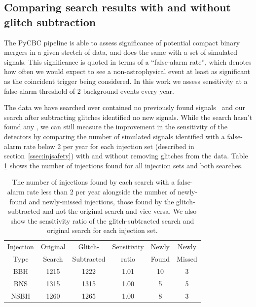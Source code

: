 \subsection{Comparing search results with and without glitch subtraction}

The PyCBC pipeline is able to assess significance of potential compact binary mergers in a given stretch of data, and does the same with a set of simulated signals. This significance is quoted in terms of a ``false-alarm rate'', which denotes how often we would expect to see a non-astrophysical event at least as significant as the coincident trigger being considered. In this work we assess sensitivity at a false-alarm threshold of 2 background events every year.

The data we have searched over contained no previously found \gw{} signals~\cite{gwtc3} and our search after subtracting \scl{} glitches identified no new \gw{} signals. While the search hasn't found any \gws{}, we can still measure the improvement in the sensitivity of the detectors by comparing the number of simulated signals identified with a false-alarm rate below 2 per year for each injection set (described in section~\ref{ssec:injsafety}) with and without removing glitches from the data. Table \ref{tab:found_injs} shows the number of injections found for all injection sets and both searches.
%
\begin{table}[tb]
\centering
\caption{\label{tab:found_injs}The number of injections found by each search with a false-alarm rate less than 2 per year alongside the number of newly-found and newly-missed injections, those found by the glitch-subtracted and not the original search and vice versa. We also show the sensitivity ratio of the glitch-subtracted search and original search for each injection set.} 
\footnotesize
\renewcommand{\arraystretch}{1.2}
\begin{tabular}{@{}cccccc}
\hline
Injection & Original  & Glitch- & Sensitivity & Newly & Newly \\
Type & Search & Subtracted & ratio & Found & Missed \\
\hline
BBH & 1215 & 1222 & 1.01 & 10 & 3 \\
BNS & 1315 & 1315 & 1.00 & 5 & 5 \\
NSBH & 1260 & 1265 & 1.00 & 8 & 3 \\
\hline
\end{tabular}


\end{table}


